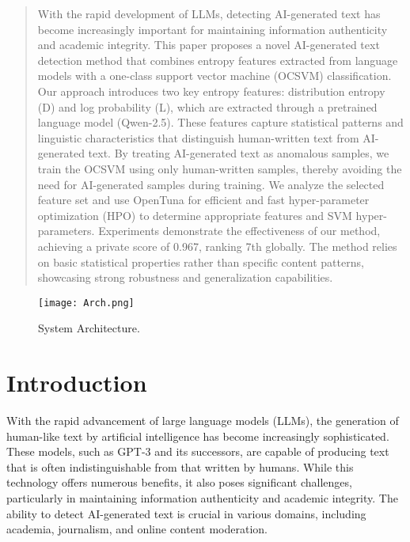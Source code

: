 
\begin{abstract}
    With the rapid development of LLMs, detecting AI-generated text has become increasingly important for maintaining information authenticity and academic integrity. This paper proposes a novel AI-generated text detection method that combines entropy features extracted from language models with a one-class support vector machine (OCSVM) classification. Our approach introduces two key entropy features: distribution entropy (D) and log probability (L), which are extracted through a pretrained language model (Qwen-2.5). These features capture statistical patterns and linguistic characteristics that distinguish human-written text from AI-generated text. By treating AI-generated text as anomalous samples, we train the OCSVM using only human-written samples, thereby avoiding the need for AI-generated samples during training. We analyze the selected feature set and use OpenTuna for efficient and fast hyper-parameter optimization (HPO) to determine appropriate features and SVM hyper-parameters. Experiments demonstrate the effectiveness of our method, achieving a private score of 0.967, ranking 7th globally. The method relies on basic statistical properties rather than specific content patterns, showcasing strong robustness and generalization capabilities.
    
    \end{abstract}
    
    \begin{figure}[ht]
    \begin{center}
    \centerline{\texttt{[image: Arch.png]}}
    \caption{System Architecture.}
    \label{Arch}
    \end{center}
    \end{figure}
    
    \section{Introduction}
    \label{Introduction}
    
    With the rapid advancement of large language models (LLMs), the generation of human-like text by artificial intelligence has become increasingly sophisticated. These models, such as GPT-3 and its successors, are capable of producing text that is often indistinguishable from that written by humans. While this technology offers numerous benefits, it also poses significant challenges, particularly in maintaining information authenticity and academic integrity. The ability to detect AI-generated text is crucial in various domains, including academia, journalism, and online content moderation.
    
